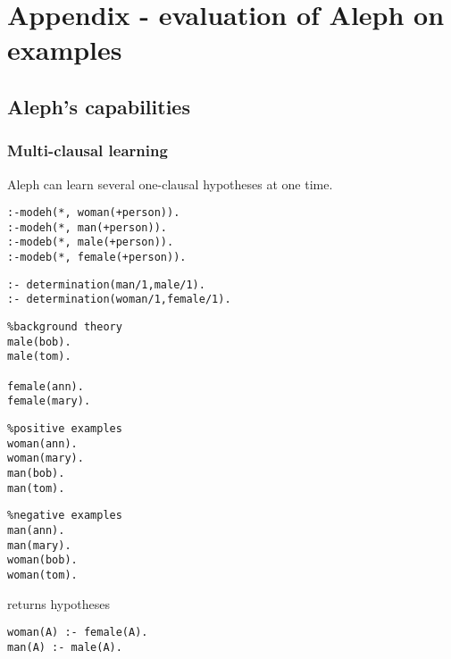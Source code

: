 \chapter{Appendix - evaluation of Aleph on examples}

\section{Aleph's capabilities}

\subsection{Multi-clausal learning}
Aleph can learn several one-clausal hypotheses at one time.

\begin{minipage}[t]{.45\textwidth}
\begin{lstlisting}
:-modeh(*, woman(+person)).
:-modeh(*, man(+person)).
:-modeb(*, male(+person)).
:-modeb(*, female(+person)).
\end{lstlisting}
\end{minipage}
\begin{minipage}[t]{.20\textwidth}
\begin{lstlisting}
:- determination(man/1,male/1).
:- determination(woman/1,female/1).
\end{lstlisting}
\end{minipage}

\begin{minipage}[t]{.30\textwidth}
\begin{lstlisting}
%background theory
male(bob).
male(tom).

female(ann).
female(mary).
\end{lstlisting}
\end{minipage}
\begin{minipage}[t]{.30\textwidth}
\begin{lstlisting}
%positive examples
woman(ann).
woman(mary).
man(bob).
man(tom).
\end{lstlisting}
\end{minipage}
\begin{minipage}[t]{.30\textwidth}
\begin{lstlisting}
%negative examples
man(ann).
man(mary).
woman(bob).
woman(tom).
\end{lstlisting}
\end{minipage}

returns hypotheses

\begin{lstlisting}
woman(A) :- female(A).
man(A) :- male(A).
\end{lstlisting}

